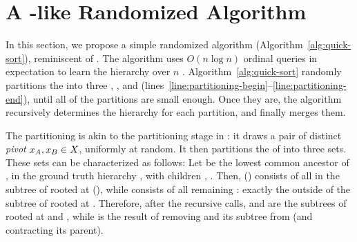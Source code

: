 
\section{A \QuickSort-like Randomized Algorithm}
\label{sec:quick-sort}

In this section, we propose a simple randomized algorithm
(Algorithm~\ref{alg:quick-sort}),
reminiscent of \QuickSort.
The algorithm uses $O(n \log n)$ ordinal queries in expectation
to learn the hierarchy over $n$ \elements.
Algorithm~\ref{alg:quick-sort} 
randomly partitions the \elements into three \partitions
\PartitionA, \PartitionB, and \PartitionC
(lines~\ref{line:partitioning-begin}--\ref{line:partitioning-end}),
until all of the partitions are small enough.
Once they are, the algorithm recursively determines the hierarchy for
each partition, and finally merges them.


The partitioning is akin to the partitioning stage in \QuickSort: 
it draws a pair of distinct \emph{pivot \elements}
$\PivotA, \PivotB \in \ElSet$, uniformly at random.
It then partitions the \elements of \ElSet into three sets.
These sets can be characterized as follows:
Let \VertexBar be the lowest common ancestor of \PivotA, \PivotB
in the ground truth hierarchy \TreeOpt,
with children \Vertex[A], \Vertex[B].
Then, \PartitionA (\PartitionB) consists of all \elements in the
subtree of \TreeOpt rooted at \Vertex[A] (\Vertex[B]),
while \PartitionC consists of all remaining \elements:
exactly the \elements outside of the subtree of \TreeOpt rooted at \VertexBar.
Therefore, after the recursive calls,
\TreeA and \TreeB are the subtrees of \TreeOpt rooted at \Vertex[A]
and \Vertex[B], while \TreeC is the result of removing \VertexBar
and its subtree from \TreeOpt (and contracting its parent).

